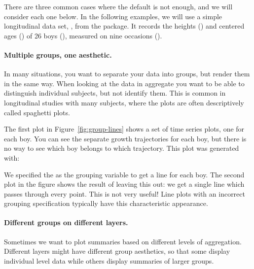 There are three common cases where the default is not enough, and we will consider each one below.  In the following examples, we will use a simple longitudinal data set, , from the  package.  It records the heights () and centered ages () of 26 boys (), measured on nine occasions (). 

\paragraph{Multiple groups, one aesthetic.} In many situations, you want to separate your data into groups, but render them in the same way.  When looking at the data in aggregate you want to be able to distinguish individual subjects, but not identify them.  This is common in longitudinal studies with many subjects, where the plots are often descriptively called spaghetti plots.  

The first plot in Figure~\ref{fig:group-lines} shows a set of time series plots, one for each boy. You can see the separate growth trajectories for each boy, but there is no way to see which boy belongs to which trajectory.  This plot was generated with:

%


\noindent We specified the  as the grouping variable to get a line for each boy. The second plot in the figure shows the result of leaving this out: we get a single line which passes through every point.  This is not very useful! Line plots with an incorrect grouping specification typically have this characteristic appearance.

% 


\paragraph{Different groups on different layers.}  Sometimes we want to plot summaries based on different levels of aggregation. Different layers might have different group aesthetics, so that some display individual level data while others display summaries of larger groups.

